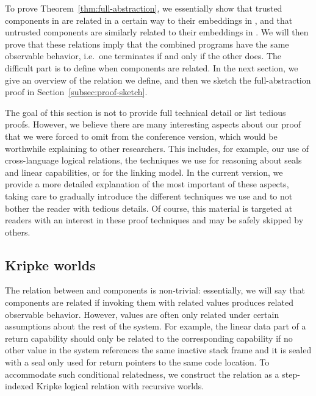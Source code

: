 To prove Theorem~\ref{thm:full-abstraction}, we essentially show that trusted components in \srccm{} are related in a certain way to their embeddings in \trgcm{}, and that untrusted \trgcm{} components are similarly related to their embeddings in \srccm{}.
We will then prove that these relations imply that the combined programs have the same observable behavior, i.e.\ one terminates if and only if the other does.
The difficult part is to define when components are related.
In the next section, we give an overview of the relation we define, and then we sketch the full-abstraction proof in Section~\ref{subsec:proof-sketch}.

\begin{jversion}
  The goal of this section is not to provide full technical detail or list tedious proofs.
  However, we believe there are many interesting aspects about our proof that we were forced to omit from the conference version, which would be worthwhile explaining to other researchers.
  This includes, for example, our use of cross-language logical relations, the techniques we use for reasoning about seals and linear capabilities, or for the linking model.
  In the current version, we provide a more detailed explanation of the most important of these aspects, taking care to gradually introduce the different techniques we use and to not bother the reader with tedious details. 
  Of course, this material is targeted at readers with an interest in these proof techniques and may be safely skipped by others.
\end{jversion}

\subsection{Kripke worlds}
\label{subsec:worlds}
The relation between \srccm{} and \trgcm{} components is non-trivial: essentially, we will say that components are related if invoking them with related values produces related observable behavior.
However, values are often only related under certain assumptions about the rest of the system.
For example, the linear data part of a return capability should only be related to the corresponding \srccm{} capability if no other value in the system references the same inactive stack frame and it is sealed with a seal only used for return pointers to the same code location.
To accommodate such conditional relatedness, we construct the relation as a step-indexed Kripke logical relation with recursive worlds.

